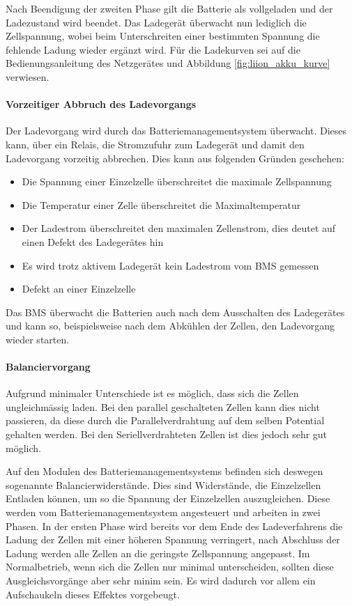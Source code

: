 Nach Beendigung der zweiten Phase gilt die Batterie als vollgeladen und der Ladezustand wird beendet. Das Ladegerät überwacht nun lediglich die Zellspannung, wobei beim Unterschreiten einer bestimmten Spannung die fehlende Ladung wieder ergänzt wird. Für die Ladekurven sei auf die Bedienungsanleitung des Netzgerätes \cite{ladegeraet} und Abbildung \ref{fig:liion_akku_kurve} verwiesen.

\paragraph{Vorzeitiger Abbruch des Ladevorgangs}
Der Ladevorgang wird durch das Batteriemanagementsystem überwacht. Dieses kann, über ein Relais, die Stromzufuhr zum Ladegerät und damit den Ladevorgang vorzeitig abbrechen. Dies kann aus folgenden Gründen geschehen: \begin{itemize}
	\item Die Spannung einer Einzelzelle überschreitet die maximale Zellspannung
	\item Die Temperatur einer Zelle überschreitet die Maximaltemperatur
	\item Der Ladestrom überschreitet den maximalen Zellenstrom, dies deutet auf einen Defekt des Ladegerätes hin
	\item Es wird trotz aktivem Ladegerät kein Ladestrom vom BMS gemessen
	\item Defekt an einer Einzelzelle
\end{itemize}
Das BMS überwacht die Batterien auch nach dem Ausschalten des Ladegerätes und kann so, beispielsweise nach dem Abkühlen der Zellen, den Ladevorgang wieder starten.

\paragraph{Balanciervorgang}
Aufgrund minimaler Unterschiede ist es möglich, dass sich die Zellen ungleichmässig laden. Bei den parallel geschalteten Zellen kann dies nicht passieren, da diese durch die Parallelverdrahtung auf dem selben Potential gehalten werden. Bei den Seriellverdrahteten Zellen ist dies jedoch sehr gut möglich.

Auf den Modulen des Batteriemanagementsystems befinden sich deswegen sogenannte Balancierwiderstände. Dies sind Widerstände, die Einzelzellen Entladen können, um so die Spannung der Einzelzellen auszugleichen. Diese werden vom Batteriemanagementsystem angesteuert und arbeiten in zwei Phasen. In der ersten Phase wird bereits vor dem Ende des Ladeverfahrens die Ladung der Zellen mit einer höheren Spannung verringert, nach Abschluss der Ladung werden alle Zellen an die geringste Zellspannung angepasst. Im Normalbetrieb, wenn sich die Zellen nur minimal unterscheiden, sollten diese Ausgleichsvorgänge aber sehr minim sein. Es wird dadurch vor allem ein Aufschaukeln dieses Effektes vorgebeugt.